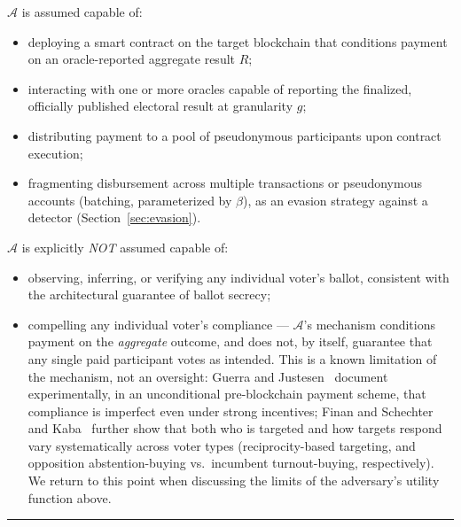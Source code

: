 \documentclass[journal,onecolumn,11pt]{IEEEtran}
\begin{document}
$\mathcal{A}$ is assumed capable of:
\begin{itemize}
  \item deploying a smart contract on the target blockchain that conditions
        payment on an oracle-reported aggregate result $R$;
  \item interacting with one or more oracles capable of reporting the
        finalized, officially published electoral result at granularity $g$;
  \item distributing payment to a pool of pseudonymous participants upon
        contract execution;
  \item fragmenting disbursement across multiple transactions or pseudonymous
        accounts (batching, parameterized by $\beta$), as an evasion strategy
        against a detector (Section~\ref{sec:evasion}).
\end{itemize}
\vspace{\baselineskip}
$\mathcal{A}$ is explicitly \emph{NOT} assumed capable of:
\begin{itemize}
  \item observing, inferring, or verifying any individual voter's ballot,
        consistent with the architectural guarantee of ballot secrecy;
  \item compelling any individual voter's compliance --- $\mathcal{A}$'s
        mechanism conditions payment on the \emph{aggregate} outcome, and does
        not, by itself, guarantee that any single paid participant votes as
        intended. This is a known limitation of the mechanism, not an
        oversight: Guerra and Justesen~\cite{guerra2022votebuying}
        document experimentally, in an unconditional pre-blockchain payment
        scheme, that compliance is imperfect even under strong incentives;
        Finan and Schechter~\cite{finan2011votebuying} and
        Kaba~\cite{kaba2022votebuying} further show that both who is
        targeted and how targets respond vary systematically across voter
        types (reciprocity-based targeting, and opposition
        abstention-buying vs.\ incumbent turnout-buying, respectively). We
        return to this point when discussing the limits of the adversary's
        utility function above.
\end{itemize}


\bigskip
\hrule
\bigskip

\end{document}
